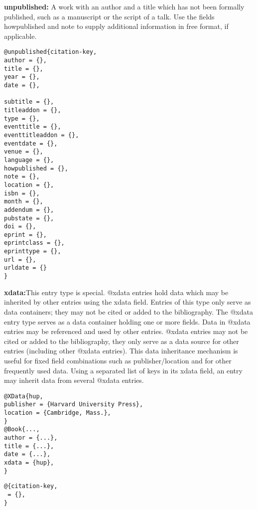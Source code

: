 \documentclass{article}
\begin{document}
\begin{multicols}{2}
\vspace{0.5cm}
\noindent \textbf{unpublished:} A work with an author and a title which has not been formally published, such as a manuscript or the script of a talk. Use the fields howpublished and note to supply additional information in free format, if applicable.
\begin{verbatim}
@unpublished{citation-key,
author = {},
title = {},
year = {},
date = {},

subtitle = {},
titleaddon = {},
type = {},
eventtitle = {},
eventtitleaddon = {},
eventdate = {},
venue = {},
language = {},
howpublished = {},
note = {},
location = {},
isbn = {},
month = {},
addendum = {},
pubstate = {},
doi = {},
eprint = {},
eprintclass = {},
eprinttype = {},
url = {},
urldate = {}
}
\end{verbatim}

\vspace{0.5cm}
\noindent \textbf{xdata:}This entry type is special. @xdata entries hold data which may be inherited by other entries using the xdata field. Entries of this type only serve as data containers; they may not be cited or added to the bibliography. The @xdata entry type serves as a data container holding one or more fields. Data in @xdata entries may be referenced and used by other entries. @xdata entries may not be cited or added to the bibliography, they only serve as a data source for other entries (including other @xdata entries). This data inheritance mechanism is useful for fixed field combinations such as publisher/location and for other frequently used data. Using a separated list of keys in its xdata field, an entry may inherit data from several @xdata entries.
\begin{verbatim}
@XData{hup,
publisher = {Harvard University Press},
location = {Cambridge, Mass.},
}
@Book{...,
author = {...},
title = {...},
date = {...},
xdata = {hup},
}
\end{verbatim}

\vspace{0.5cm}
\noindent \textbf{}
\begin{verbatim}
@{citation-key,
 = {},
}
\end{verbatim}

\end{multicols}
%
%
\end{document}
